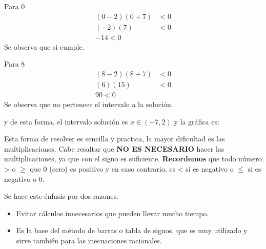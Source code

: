     Para 0
    \begin{align*}
        (0-2)(0+7) & < 0  		\\
        (-2)(7)   & < 0\\
        -14 < 0
    \end{align*}
    Se observa que si cumple.

    Para 8
    \begin{align*}
        (8-2)(8+7) & < 0  		\\
        (6)(15)   & < 0\\
        90 < 0
    \end{align*}
    Se observa que no pertenece el intervalo a la solución.

    y de esta forma, el intervalo solución es $x\in(-7,2)$ y la gráfica es:

    \vspace*{1cm}

    Esta forma de resolver es sencilla y practica, la mayor dificultad es las
    multiplicaciones. Cabe resaltar que \textbf{NO ES NECESARIO} hacer las
    multiplicaciones, ya que con el signo es suficiente. \textbf{Recordemos} que
    todo número > o $\geq$ que 0 (cero) es positivo y en caso contrario, es
    < si es negativo o $ \leq $  si es negativo o 0.

    Se hace este énfasis por dos razones.

    \begin{itemize}
        \item Evitar cálculos innecesarios que pueden llevar mucho tiempo.
        \item Es la base del método de barras o tabla de signos, que es muy
            utilizado y sirve también para las inecuaciones racionales.
    \end{itemize}

